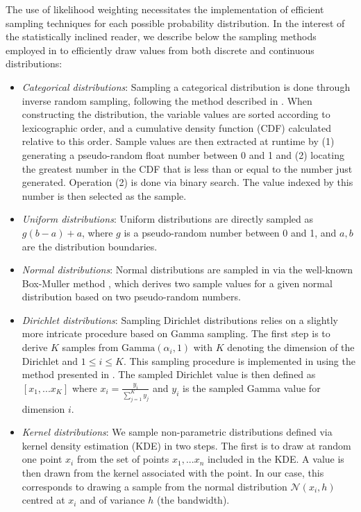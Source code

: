 The use of likelihood weighting necessitates the implementation of efficient sampling techniques for each possible probability distribution.  In the interest of the statistically inclined reader, we describe below the sampling methods employed in \opendial{} to efficiently draw values from both discrete and continuous distributions:
\begin{itemize}
\item \textit{Categorical distributions}:  Sampling a categorical distribution is done through inverse random sampling, following the method described in \citet[p.~489]{Koller+Friedman:09}. When constructing the distribution, the variable values are sorted according to lexicographic order, and a cumulative density function (CDF) calculated relative to this order.  Sample values are then extracted at runtime by (1) generating a pseudo-random float number between 0 and 1 and (2) locating the greatest number in the CDF that is less than or equal to the number just generated.  Operation (2) is done via binary search. The value indexed by this number is then selected as the sample.
\item \textit{Uniform distributions}:  Uniform distributions are directly sampled as $g (b-a) + a$, where $g$ is a pseudo-random number between 0 and 1, and $a,b$ are the distribution boundaries.

\item \textit{Normal distributions}:  Normal distributions are sampled in \opendial{} via the well-known Box-Muller method \citep{rBOX58a}, which derives two sample values for a given normal distribution based on two pseudo-random numbers.

\item \textit{Dirichlet distributions}:  Sampling Dirichlet distributions relies on a slightly more intricate procedure based on Gamma sampling.   The first step is to derive $K$ samples from $\mathrm{Gamma} (\alpha_i, 1)$ with $K$ denoting the dimension of the Dirichlet and $1 \leq i \leq K$.  This sampling procedure is implemented in \opendial{} using the method presented in \cite{cheng1979}.  The sampled Dirichlet value is then defined as $[x_1,...x_K]$ where $x_i = \frac{y_i}{\sum_{j=1}^K y_j}$ and $y_i$ is the sampled Gamma value for dimension $i$.
\item \textit{Kernel distributions}:  We sample non-parametric distributions defined via kernel density estimation (KDE) in two steps. The first is to draw at random one point $x_i$ from the set of points $x_1,...x_n$ included in the KDE. A value is then drawn from the kernel associated with the point. In our case, this corresponds to drawing a sample from the normal distribution $\mathcal{N}(x_i,h)$ centred at $x_i$ and of variance $h$ (the bandwidth). 
\end{itemize}

